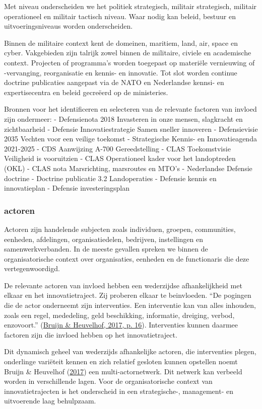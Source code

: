\documentclass[
]{book}
\begin{document}
Met niveau onderscheiden we het politiek strategisch, militair strategisch, militair operationeel en militair tactisch niveau. Waar nodig kan beleid, bestuur en uitvoeringsniveaus worden onderscheiden.

Binnen de militaire context kent de domeinen, maritiem, land, air, space en cyber. Vakgebieden zijn talrijk zowel binnen de militaire, civiele en academische context. Projecten of programma's worden toegepast op materiële vernieuwing of -vervanging, reorganisatie en kennis- en innovatie. Tot slot worden continue doctrine publicaties aangepast via de NATO en Nederlandse kennsi- en expertisecentra en beleid gecreëerd op de ministeries.

Bronnen voor het identificeren en selecteren van de relevante factoren van invloed zijn ondermeer:
- Defensienota 2018 Invasteren in onze mensen, slagkracht en zichtbaarheid
- Defensie Innovatiestrategie Samen sneller innoveren
- Defensievisie 2035 Vechten voor een veilige toekomst
- Strategische Kennis- en Innovatieagenda 2021-2025
- CDS Aanwijzing A-700 Gereedstelling
- CLAS Toekomstvisie Veiligheid is vooruitzien
- CLAS Operationeel kader voor het landoptreden (OKL)
- CLAS nota Marsrichting, marsroutes en MTO's
- Nederlandse Defensie doctrine
- Doctrine publicatie 3.2 Landoperaties
- Defensie kennis en innovatieplan
- Defensie investeringsplan

\hypertarget{actoren}{%
\subsubsection{actoren}\label{actoren}}

Actoren zijn handelende subjecten zoals individuen, groepen, communities, eenheden, afdelingen, organisatiedelen, bedrijven, instellingen en samenwerkverbanden. In de meeste gevallen spreken we binnen de organisatorische context over organisaties, eenheden en de functionaris die deze vertegenwoordigd.

De relevante actoren van invloed hebben een wederzijdse afhankelijkheid met elkaar en het innovatietraject. Zij proberen elkaar te beinvloeden. ``De pogingen die de actor onderneemt zijn interventies. Een interventie kan van alles inhouden, zoals een regel, mededeling, geld beschikking, informatie, dreiging, verbod, enzovoort.'' (\protect\hyperlink{ref-bruijn2017management}{Bruijn \& Heuvelhof, 2017, p. 16}). Interventies kunnen daarmee factoren zijn die invloed hebben op het innovatietraject.

Dit dynamisch geheel van wederzijds afhankelijke actoren, die interventies plegen, onderlinge variëteit kennen en zich relatief gesloten kunnen opstellen noemt Bruijn \& Heuvelhof (\protect\hyperlink{ref-bruijn2017management}{2017}) een multi-actornetwerk. Dit netwerk kan verbeeld worden in verschillende lagen. Voor de organisatorische context van innovatietrajecten is het onderscheid in een strategische-, management- en uitvoerende laag behulpzaam.
\end{document}
